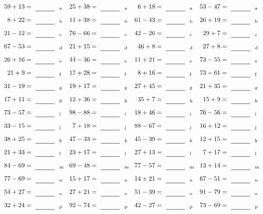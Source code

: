 \documentclass
[
  draft    = true,
  fontsize = 11pt,
  parskip  = half-
]
{scrartcl}
\begin{document}
\clearpage
\begin{align*}
    \pline{59+13}&=\rline{a}
  & \pline{25+38}&=\rline{a}
  & \pline{6+18}&=\rline{a}
  & \pline{53-47}&=\rline{a} \\[1ex]
    \pline{8+22}&=\rline{b}
  & \pline{11+38}&=\rline{b}
  & \pline{61-43}&=\rline{b}
  & \pline{26+19}&=\rline{b} \\[1ex]
    \pline{21-12}&=\rline{c}
  & \pline{76-66}&=\rline{c}
  & \pline{42-26}&=\rline{c}
  & \pline{29+7}&=\rline{c} \\[1ex]
    \pline{67-53}&=\rline{d}
  & \pline{21+15}&=\rline{d}
  & \pline{46+8}&=\rline{d}
  & \pline{27+8}&=\rline{d} \\[1ex]
    \pline{26+16}&=\rline{e}
  & \pline{44-36}&=\rline{e}
  & \pline{11+21}&=\rline{e}
  & \pline{73-55}&=\rline{e} \\[1ex]
    \pline{21+9}&=\rline{f}
  & \pline{17+28}&=\rline{f}
  & \pline{8+16}&=\rline{f}
  & \pline{73-61}&=\rline{f} \\[1ex]
    \pline{31-19}&=\rline{g}
  & \pline{19+17}&=\rline{g}
  & \pline{27+45}&=\rline{g}
  & \pline{21+35}&=\rline{g} \\[1ex]
    \pline{17+11}&=\rline{h}
  & \pline{12+36}&=\rline{h}
  & \pline{35+7}&=\rline{h}
  & \pline{15+9}&=\rline{h} \\[1ex]
    \pline{73-57}&=\rline{i}
  & \pline{98-88}&=\rline{i}
  & \pline{18+46}&=\rline{i}
  & \pline{76-56}&=\rline{i} \\[1ex]
    \pline{33-15}&=\rline{j}
  & \pline{7+18}&=\rline{j}
  & \pline{88-67}&=\rline{j}
  & \pline{16+12}&=\rline{j} \\[1ex]
    \pline{38+25}&=\rline{k}
  & \pline{47-33}&=\rline{k}
  & \pline{45-39}&=\rline{k}
  & \pline{12+15}&=\rline{k} \\[1ex]
    \pline{21+33}&=\rline{l}
  & \pline{23+17}&=\rline{l}
  & \pline{27+13}&=\rline{l}
  & \pline{7+17}&=\rline{l} \\[1ex]
    \pline{84-69}&=\rline{m}
  & \pline{69-48}&=\rline{m}
  & \pline{77-57}&=\rline{m}
  & \pline{13+14}&=\rline{m} \\[1ex]
    \pline{77-69}&=\rline{n}
  & \pline{15+17}&=\rline{n}
  & \pline{14+21}&=\rline{n}
  & \pline{67-51}&=\rline{n} \\[1ex]
    \pline{54+27}&=\rline{o}
  & \pline{27+21}&=\rline{o}
  & \pline{51-39}&=\rline{o}
  & \pline{91-79}&=\rline{o} \\[1ex]
    \pline{32+24}&=\rline{p}
  & \pline{92-74}&=\rline{p}
  & \pline{42-27}&=\rline{p}
  & \pline{73-69}&=\rline{p}
\end{align*}
\end{document}
